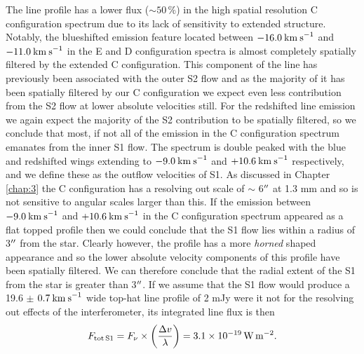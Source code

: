 The line profile has a lower flux ($\sim 50\,\%$) in the high spatial resolution C configuration spectrum due to its lack of sensitivity to extended structure. Notably, the blueshifted emission feature located between $-16.0\>{\rm km\>s}^{-1}$ and $-11.0\>{\rm km\>s}^{-1}$ in the E and D configuration spectra is almost completely spatially filtered by the extended C configuration. This component of the line has previously been associated with the outer S2 flow \citep{huggins_1987} and as the majority of it has been spatially filtered by our C configuration we expect even less contribution from the S2 flow at lower absolute velocities still. For the redshifted line emission we again expect the majority of the S2 contribution to be spatially filtered, so we conclude that most, if not all of the emission in the C configuration spectrum emanates from the inner S1 flow. The spectrum is double peaked with the blue and redshifted wings extending to $-9.0\>{\rm km\>s}^{-1}$ and $+10.6\>{\rm km\>s}^{-1}$ respectively, and we define these as the outflow velocities of S1. As discussed in Chapter \ref{chap:3} the C configuration has a resolving out scale of $\sim$ 6$^{\prime\prime}$ at 1.3 mm and so is not sensitive to angular scales larger than this. If the emission between $-9.0\>{\rm km\>s}^{-1}$ and $+10.6\>{\rm km\>s}^{-1}$ in the C configuration spectrum appeared as a flat topped profile then we could conclude that the S1 flow lies within a radius of 3$^{\prime\prime}$ from the star. Clearly however, the profile has a more \textit{horned} shaped appearance and so the lower absolute velocity components of this profile have been spatially filtered. We can therefore conclude that the radial extent of the S1 from the star is greater than 3$^{\prime\prime}$. If we assume that the S1 flow would produce a 19.6 $\pm$ $0.7\>{\rm km\>s}^{-1}$ wide top-hat line profile of 2 mJy were it not for the resolving out effects of the interferometer, its integrated line flux is then
\begin{equation}
F_{\rm{tot\,S1}}=F_{\nu}\times \left(\frac{\Delta v}{\lambda}\right)= 3.1 \times 10{}^{-19}\,\rm{W\,m}{}^{-2}.
\label{eq:5.1}
\end{equation}

